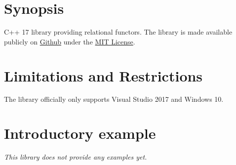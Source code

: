 \documentclass[oneside]{article}
\begin{document}
\maketitle
\tableofcontents
\section{Synopsis}
C++ 17 library providing relational functors.
The library is made available publicly on
\href{\GetLibraryRepository}{Github}
under the
\href{\GetLibraryRepository/blob/master/LICENSE}{MIT License}.

\section{Limitations and Restrictions}
The library officially only supports Visual Studio 2017 and Windows 10.

\section{Introductory example}
\textit{\color{orange}This library does not provide any examples yet.}
\end{document}
